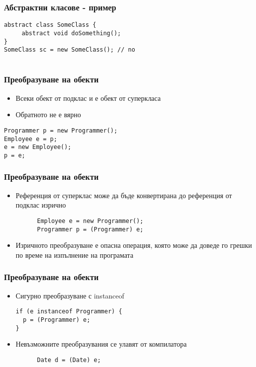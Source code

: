 \documentclass{beamer}
\begin{document}
\begin{frame}[fragile]
  \frametitle{Абстрактни класове - пример}
  \transdissolve
\begin{lstlisting}
abstract class SomeClass {
     abstract void doSomething();
}
SomeClass sc = new SomeClass(); // no
  
\end{lstlisting}
\end{frame}

\begin{frame}[fragile]
  \frametitle{Преобразуване на обекти}
  \transdissolve
  \begin{itemize}
  \item Всеки обект от подклас и е обект от суперкласа
  \item Обратното не е вярно
  \end{itemize}
\begin{lstlisting}
Programmer p = new Programmer();
Employee e = p;
e = new Employee();
p = e;
\end{lstlisting}

\end{frame}

\begin{frame}[fragile]
  \frametitle{Преобразуване на обекти}
  \transdissolve
  \begin{itemize}
  \item Референция от суперклас може да бъде конвертирана до
    референция от подклас изрично
    \begin{lstlisting}
      Employee e = new Programmer();
      Programmer p = (Programmer) e;
    \end{lstlisting}

  \item Изричното преобразуване е опасна операция, която може да
    доведе го грешки по време на изпълнение на програмата
  \end{itemize}
\end{frame}

\begin{frame}[fragile]
  \frametitle{Преобразуване на обекти}
  \transdissolve
  \begin{itemize}
  \item Сигурно преобразуване с instanceof
    \begin{lstlisting}
if (e instanceof Programmer) {
  p = (Programmer) e;
}
    \end{lstlisting}

  \item Невъзможните преобразувания се улавят от компилатора
    \begin{lstlisting}
      Date d = (Date) e;
    \end{lstlisting}

  \end{itemize}
\end{frame}
\end{document}
